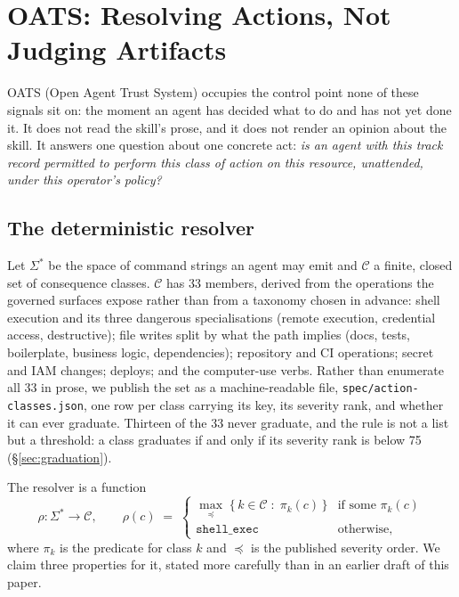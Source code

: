 \documentclass[10pt]{article}
\begin{document}
\section{OATS: Resolving Actions, Not Judging Artifacts}
\label{sec:oats}

OATS (Open Agent Trust System) occupies the control point none of these signals
sit on: the moment an agent has decided what to do and has not yet done it. It does
not read the skill's prose, and it does not render an opinion about the skill. It
answers one question about one concrete act: \emph{is an agent with this track
record permitted to perform this class of action on this resource, unattended,
under this operator's policy?}

\subsection{The deterministic resolver}
\label{sec:resolver}

Let $\Sigma^*$ be the space of command strings an agent may emit and $\mathcal{C}$
a finite, closed set of consequence classes. $\mathcal{C}$ has 33 members, derived
from the operations the governed surfaces expose rather than from a taxonomy chosen
in advance: shell execution and its three dangerous specialisations (remote
execution, credential access, destructive); file writes split by what the path
implies (docs, tests, boilerplate, business logic, dependencies); repository and CI
operations; secret and IAM changes; deploys; and the computer-use verbs. Rather
than enumerate all 33 in prose, we publish the set as a machine-readable file,
\texttt{spec/action-classes.json}, one row per class carrying its key, its severity
rank, and whether it can ever graduate. Thirteen of the 33 never graduate, and the
rule is not a list but a threshold: a class graduates if and only if its severity
rank is below 75 (\S\ref{sec:graduation}).

The resolver is a function
\[
  \rho : \Sigma^* \rightarrow \mathcal{C}, \qquad
  \rho(c) \;=\;
  \begin{cases}
    \max_{\preceq}\;\{\, k \in \mathcal{C} \;:\; \pi_k(c) \,\} & \text{if some } \pi_k(c) \\
    \texttt{shell\_exec} & \text{otherwise,}
  \end{cases}
\]
where $\pi_k$ is the predicate for class $k$ and $\preceq$ is the published severity
order. We claim three properties for it, stated more carefully than in an earlier
draft of this paper.
\end{document}
